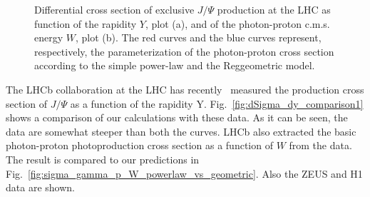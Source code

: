 \documentclass[12pt]{article}
\begin{document}
\begin{figure}[!t]
  \centering
  \caption{Differential cross section of exclusive $J/\Psi$ production at the LHC as function of the rapidity $Y$, plot (a), and of the photon-proton c.m.s. energy $W$, plot (b).
           The red curves and the blue curves represent, respectively,  the parameterization of the photon-proton cross section according to the simple power-law and  the Reggeometric model.}
\end{figure}

The LHCb collaboration at the LHC has recently~\cite{LHCb1, LHCb2} measured the production cross section of $J/\Psi$ as a function of the rapidity Y.
Fig.~\ref{fig:dSigma_dy_comparison1} shows a comparison of our calculations with these data.
As it can be seen, the data are somewhat steeper than both the curves.
LHCb also extracted the basic photon-proton photoproduction cross section as a function of $W$ from the data.
The result is compared to our predictions in  Fig.~\ref{fig:sigma_gamma_p_W_powerlaw_vs_geometric}.
Also the ZEUS and H1 data are shown.
\end{document}
